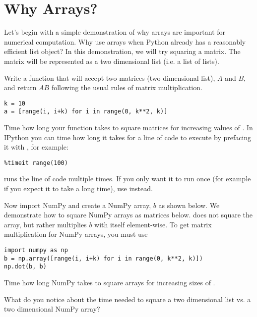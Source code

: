 \label{lab:Essentials_NumPy}

\section*{Why Arrays?}
\begin{problem}
Let's begin with a simple demonstration of why arrays are important for numerical computation.
Why use arrays when Python already has a reasonably efficient list object?
In this demonstration, we will try squaring a matrix.
The matrix will be represented as a two dimensional list (i.e. a list of lists).

Write a function that will accept two matrices (two dimensional list), $A$ and $B$, and return $AB$ following the usual rules of matrix multiplication.
\begin{lstlisting}
k = 10
a = [range(i, i+k) for i in range(0, k**2, k)]
\end{lstlisting}
Time how long your function takes to square matrices for increasing values of .
In IPython you can time how long it takes for a line of code to execute by prefacing it with , for example:
\begin{lstlisting}
%timeit range(100)
\end{lstlisting}
 runs the line of code multiple times.
If you only want it to run once (for example if you expect it to take a long time), use  instead.

Now import NumPy and create a NumPy array, $b$ as shown below.
We demonstrate how to square NumPy arrays as matrices below.
 does not square the array, but rather multiplies $b$ with itself element-wise.
To get matrix multiplication for NumPy arrays, you must use 
\begin{lstlisting}
import numpy as np
b = np.array([range(i, i+k) for i in range(0, k**2, k)])
np.dot(b, b)
\end{lstlisting}
Time how long NumPy takes to square arrays for increasing sizes of .

What do you notice about the time needed to square a two dimensional list vs. a two dimensional NumPy array?


\end{problem}
